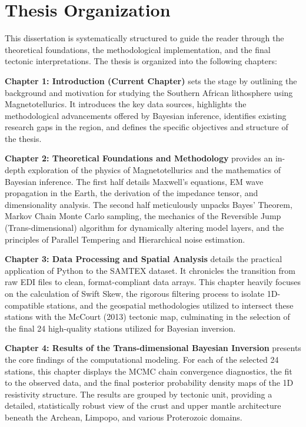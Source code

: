 \section{Thesis Organization}

This dissertation is systematically structured to guide the reader through the theoretical foundations, the methodological implementation, and the final tectonic interpretations. The thesis is organized into the following chapters:

\textbf{Chapter 1: Introduction (Current Chapter)} sets the stage by outlining the background and motivation for studying the Southern African lithosphere using Magnetotellurics. It introduces the key data sources, highlights the methodological advancements offered by Bayesian inference, identifies existing research gaps in the region, and defines the specific objectives and structure of the thesis.

\textbf{Chapter 2: Theoretical Foundations and Methodology} provides an in-depth exploration of the physics of Magnetotellurics and the mathematics of Bayesian inference. The first half details Maxwell's equations, EM wave propagation in the Earth, the derivation of the impedance tensor, and dimensionality analysis. The second half meticulously unpacks Bayes' Theorem, Markov Chain Monte Carlo sampling, the mechanics of the Reversible Jump (Trans-dimensional) algorithm for dynamically altering model layers, and the principles of Parallel Tempering and Hierarchical noise estimation.

\textbf{Chapter 3: Data Processing and Spatial Analysis} details the practical application of Python to the SAMTEX dataset. It chronicles the transition from raw EDI files to clean, format-compliant data arrays. This chapter heavily focuses on the calculation of Swift Skew, the rigorous filtering process to isolate 1D-compatible stations, and the geospatial methodologies utilized to intersect these stations with the McCourt (2013) tectonic map, culminating in the selection of the final 24 high-quality stations utilized for Bayesian inversion.

\textbf{Chapter 4: Results of the Trans-dimensional Bayesian Inversion} presents the core findings of the computational modeling. For each of the selected 24 stations, this chapter displays the MCMC chain convergence diagnostics, the fit to the observed data, and the final posterior probability density maps of the 1D resistivity structure. The results are grouped by tectonic unit, providing a detailed, statistically robust view of the crust and upper mantle architecture beneath the Archean, Limpopo, and various Proterozoic domains.


